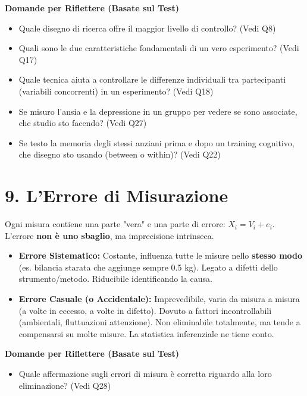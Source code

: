 \documentclass[12pt, a4paper]{article}
\newenvironment{reflectionbox}{%
    \begin{framed}\par\medskip\noindent
    \textbf{\color{boxtitlecolor}Domande per Riflettere (Basate sul Test)} \par
    \begin{itemize}[leftmargin=*, label=$\blacktriangleright$]
}{%
    \end{itemize}\par\medskip
    \end{framed}
}
\begin{document}
\begin{reflectionbox}
    \item Quale disegno di ricerca offre il maggior livello di controllo? (Vedi Q8)
    \item Quali sono le due caratteristiche fondamentali di un vero esperimento? (Vedi Q17)
    \item Quale tecnica aiuta a controllare le differenze individuali tra partecipanti (variabili concorrenti) in un esperimento? (Vedi Q18)
    \item Se misuro l'ansia e la depressione in un gruppo per vedere se sono associate, che studio sto facendo? (Vedi Q27)
    \item Se testo la memoria degli stessi anziani prima e dopo un training cognitivo, che disegno sto usando (between o within)? (Vedi Q22)
\end{reflectionbox}

\section*{9. L'Errore di Misurazione}
Ogni misura contiene una parte "vera" e una parte di errore: $X_i = V_i + e_i$. L'errore \textbf{non è uno sbaglio}, ma imprecisione intrinseca.
\begin{itemize}
    \item \textbf{Errore Sistematico:} Costante, influenza tutte le misure nello \textbf{stesso modo} (es. bilancia starata che aggiunge sempre 0.5 kg). Legato a difetti dello strumento/metodo. Riducibile identificando la causa.
    \item \textbf{Errore Casuale (o Accidentale):} Imprevedibile, varia da misura a misura (a volte in eccesso, a volte in difetto). Dovuto a fattori incontrollabili (ambientali, fluttuazioni attenzione). Non eliminabile totalmente, ma tende a compensarsi su molte misure. La statistica inferenziale ne tiene conto.
\end{itemize}

\begin{reflectionbox}
    \item Quale affermazione sugli errori di misura è corretta riguardo alla loro eliminazione? (Vedi Q28)
\end{reflectionbox}
\end{document}
